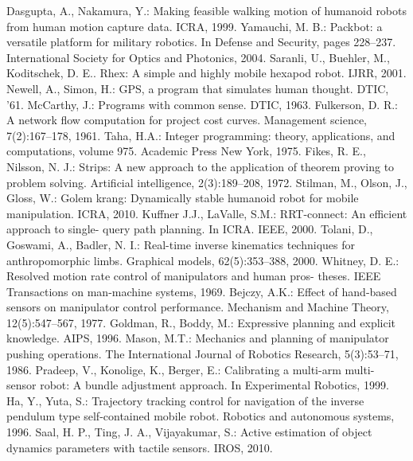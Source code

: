 \documentclass[runningheads,a4paper]{llncs}
\begin{document}
\begin{thebibliography}{27}
 Dasgupta, A., Nakamura, Y.: Making feasible walking motion of
humanoid robots from human motion capture data. ICRA, 1999.
 Yamauchi, M. B.: Packbot: a versatile platform for military robotics. In Defense
and Security, pages 228–237. International Society for Optics and Photonics, 2004.
 Saranli, U., Buehler, M., Koditschek, D. E.. Rhex: A simple and
highly mobile hexapod robot. IJRR, 2001.
 Newell, A., Simon, H.: GPS, a program that simulates human thought.
DTIC, '61.
 McCarthy, J.: Programs with common sense. DTIC, 1963.
 Fulkerson, D. R.: A network flow computation for project cost curves. Management science, 7(2):167–178, 1961.
 Taha, H.A.: Integer programming: theory, applications, and computations,
volume 975. Academic Press New York, 1975.
 Fikes, R. E., Nilsson, N. J.: Strips: A new approach to the application of
theorem proving to problem solving. Artificial intelligence, 2(3):189–208, 1972.
 Stilman, M., Olson, J., Gloss, W.: Golem krang: Dynamically stable
humanoid robot for mobile manipulation. ICRA, 2010.
 Kuffner J.J., LaValle, S.M.: RRT-connect: An efficient approach to single-
query path planning. In ICRA. IEEE, 2000.
 Tolani, D., Goswami, A., Badler, N. I.: Real-time inverse kinematics techniques for anthropomorphic limbs. Graphical models, 62(5):353–388,
2000.
 Whitney, D. E.: Resolved motion rate control of manipulators and human pros-
theses. IEEE Transactions on man-machine systems, 1969.
 Bejczy, A.K.: Effect of hand-based sensors on manipulator control performance.
Mechanism and Machine Theory, 12(5):547–567, 1977.
 Goldman, R., Boddy, M.: Expressive planning and explicit knowledge. AIPS, 1996.
 Mason, M.T.: Mechanics and planning of manipulator pushing operations.
The International Journal of Robotics Research, 5(3):53–71, 1986.
 Pradeep, V., Konolige, K., Berger, E.: Calibrating a multi-arm multi-
sensor robot: A bundle adjustment approach. In Experimental Robotics, 1999.
 Ha, Y., Yuta, S.: Trajectory tracking control for navigation of the
inverse pendulum type self-contained mobile robot. Robotics and autonomous systems, 1996.
 Saal, H. P., Ting, J. A.,  Vijayakumar, S.: Active estimation of object dynamics
parameters with tactile sensors. IROS, 2010. 
\end{thebibliography}
\end{document}
